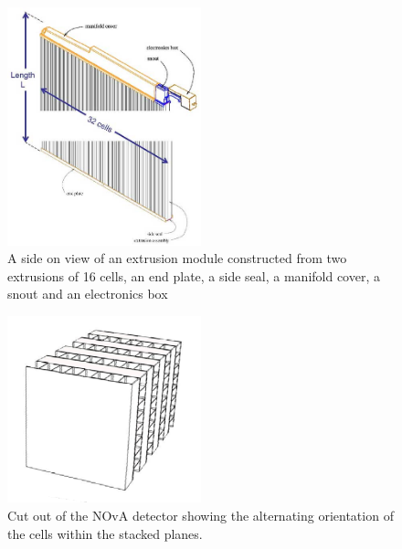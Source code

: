 

\begin{figure}
  \centering
  \includegraphics[width=0.5\textwidth]{../../img/det/gen/extrusionModule.jpg}
  \caption{A side on view of an extrusion module constructed from two
    extrusions of 16 cells, an end plate, a side seal, a manifold cover,
    a snout and an electronics box  }
  \label{fig:module}
\end{figure}

\begin{figure}
  \centering
  \includegraphics[width=0.5\textwidth]{../../img/det/gen/planes.png}
  \caption{Cut out of the NOvA detector showing the
    alternating orientation of the cells within the stacked planes.}
  \label{fig:stackedPlanes}
\end{figure}


